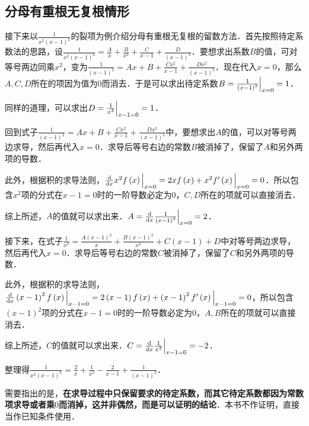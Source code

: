 \documentclass{ctexbook}
\newcommand*{\dif}{\mathop{}\!\mathrm{d}}
\begin{document}
\subsection{分母有重根无复根情形}
接下来以$\frac{1}{x^{2}\left(x-1\right)^{2}}$的裂项为例介绍分母有重根无复根的留数方法．首先按照待定系数法的思路，设$\frac{1}{x^{2}\left(x-1\right)^{2}}=\frac{A}{x}+\frac{B}{x^{2}}+\frac{C}{x-1}+\frac{D}{\left(x-1\right)^{2}}$．要想求出系数$B$的值，可对等号两边同乘$x^{2}$，变为$\frac{1}{\left(x-1\right)^{2}}=Ax+B+\frac{Cx^{2}}{x-1}+\frac{Dx^{2}}{\left(x-1\right)^{2}}$．现在代入$x=0$，那么$A,C,D$所在的项因为值为$0$而消去．于是可以求出待定系数$B=\frac{1}{\left(x-1\right)^{2}}\Big{|}_{x=0}=1$．\par
同样的道理，可以求出$D=\frac{1}{x^{2}}\Big{|}_{x-1=0}=1$．\par
回到式子$\frac{1}{\left(x-1\right)^{2}}=Ax+B+\frac{Cx^{2}}{x-1}+\frac{Dx^{2}}{\left(x-1\right)^{2}}$中，要想求出$A$的值，可以对等号两边求导，然后再代入$x=0$．求导后等号右边的常数$B$被消掉了，保留了$A$和另外两项的导数．\par
此外，根据积的求导法则，$\frac{\mathrm{d}}{\dif{x}}x^{2}f\left(x\right)\Big{|}_{x=0}=2xf\left(x\right)+x^{2}f'\left(x\right)\Big{|}_{x=0}=0$．所以包含$x^{2}$项的分式在$x-1=0$时的一阶导数必定为$0$，$C,D$所在的项就可以直接消去．\par
综上所述，$A$的值就可以求出来．$A=\frac{\mathrm{d}}{\dif{x}}\frac{1}{\left(x-1\right)^{2}}\Big{|}_{x=0}=2$．\par
接下来，在式子$\frac{1}{x^{2}}=\frac{A\left(x-1\right)^{2}}{x}+\frac{B\left(x-1\right)^{2}}{x^{2}}+C\left(x-1\right)+D$中对等号两边求导，然后再代入$x=0$．求导后等号右边的常数$C$被消掉了，保留了$C$和另外两项的导数．\par
此外，根据积的求导法则，$\frac{\mathrm{d}}{\dif{x}}\left(x-1\right)^{2}f\left(x\right)\Big{|}_{x-1=0}=2\left(x-1\right)f\left(x\right)+\left(x-1\right)^{2}f'\left(x\right)\Big{|}_{x-1=0}=0$，所以包含$\left(x-1\right)^{2}$项的分式在$x-1=0$时的一阶导数必定为$0$，$A,B$所在的项就可以直接消去．\par
综上所述，$C$的值就可以求出来．$C=\frac{\mathrm{d}}{\dif{x}}\frac{1}{x^{2}}\Big{|}_{x-1=0}=-2$．\par
整理得$\frac{1}{x^{2}\left(x-1\right)^{2}}=\frac{2}{x}+\frac{1}{x^{2}}-\frac{2}{x-1}+\frac{1}{\left(x-1\right)^{2}}$．\par
需要指出的是，\textbf{在求导过程中只保留要求的待定系数，而其它待定系数都因为常数项求导或者乘$0$而消掉，这并非偶然，而是可以证明的结论}．本书不作证明，直接当作已知条件使用．\par
\end{document}
